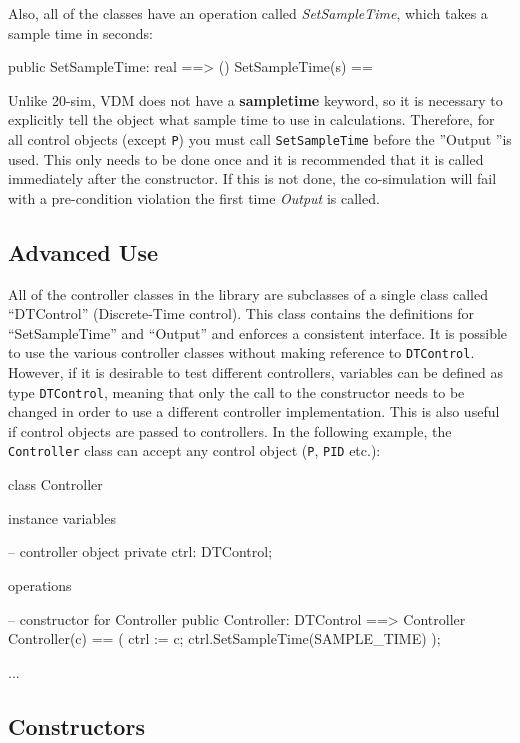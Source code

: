 \documentclass{crescendorepchap}
\begin{document}
Also, all of the classes have an operation called \emph{SetSampleTime},
which takes a sample time in seconds:

\begin{vdmrt}
public SetSampleTime: real ==> ()
SetSampleTime(s) ==
\end{vdmrt}

Unlike 20-sim, VDM does not have a \textbf{sampletime} keyword, so it is
necessary to explicitly tell the object what sample time to use in
calculations. Therefore, for all control objects (except \texttt{P}) you must
call \texttt{SetSampleTime} before the ''Output ''is used. This only needs
to be done once and it is recommended that it is called immediately
after the constructor. If this is not done, the co-simulation will fail
with a pre-condition violation the first time \emph{Output} is called.

\subsection{Advanced Use}

All of the controller classes in the library are subclasses of a single
class called ``DTControl'' (Discrete-Time control). This class contains
the definitions for ``SetSampleTime'' and ``Output'' and enforces a
consistent interface. It is possible to use the various controller
classes without making reference to \texttt{DTControl}. However, if it is
desirable to test different controllers, variables can be defined as
type \texttt{DTControl}, meaning that only the call to the constructor
needs to be changed in order to use a different controller
implementation. This is also useful if control objects are passed to
controllers. In the following example, the \texttt{Controller} class can
accept any control object (\texttt{P}, \texttt{PID} etc.):

\begin{vdmrt}
class Controller

instance variables

-- controller object
private ctrl: DTControl;

operations

-- constructor for Controller
public Controller: DTControl ==> Controller
Controller(c) ==
(
ctrl := c;
ctrl.SetSampleTime(SAMPLE_TIME)
);

...
\end{vdmrt}

\subsection{Constructors}
\end{document}
